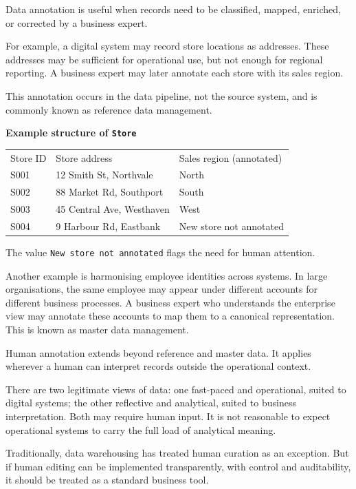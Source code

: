 \documentclass[10pt,openany,10pt]{book}
\newcounter{none}
\let\podeToprule\toprule
\let\podeMidrule\midrule
\let\podeBottomrule\bottomrule
\renewcommand{\toprule}{\arrayrulecolor{pbiGrid}\podeToprule}
\renewcommand{\midrule}{\arrayrulecolor{pbiGrid}\podeMidrule}
\renewcommand{\bottomrule}{\arrayrulecolor{pbiGrid}\podeBottomrule}
\begin{document}
Data annotation is useful when records need to be classified, mapped,
enriched, or corrected by a business expert.

For example, a digital system may record store locations as addresses.
These addresses may be sufficient for operational use, but not enough
for regional reporting. A business expert may later annotate each store
with its sales region.

This annotation occurs in the data pipeline, not the source system, and
is commonly known as reference data management.

\textbf{Example structure of
\texttt{\textquotesingle{}Store\textquotesingle{}}}

{\def\LTcaptype{none} %
\begin{longtable}[]{@{}lll@{}}
\toprule\noalign{}
Store ID & Store address & Sales region (annotated) \\
\midrule\noalign{}
\endhead
\bottomrule\noalign{}
\endlastfoot
S001 & 12 Smith St, Northvale & North \\
S002 & 88 Market Rd, Southport & South \\
S003 & 45 Central Ave, Westhaven & West \\
S004 & 9 Harbour Rd, Eastbank & New store not annotated \\
\end{longtable}
}

The value \texttt{New\ store\ not\ annotated} flags the need for human
attention.

Another example is harmonising employee identities across systems. In
large organisations, the same employee may appear under different
accounts for different business processes. A business expert who
understands the enterprise view may annotate these accounts to map them
to a canonical representation. This is known as master data management.

Human annotation extends beyond reference and master data. It applies
wherever a human can interpret records outside the operational context.

There are two legitimate views of data: one fast-paced and operational,
suited to digital systems; the other reflective and analytical, suited
to business interpretation. Both may require human input. It is not
reasonable to expect operational systems to carry the full load of
analytical meaning.

Traditionally, data warehousing has treated human curation as an
exception. But if human editing can be implemented transparently, with
control and auditability, it should be treated as a standard business
tool.
\end{document}
